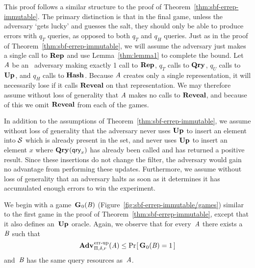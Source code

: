 This proof follows a similar structure to the proof of
Theorem~\ref{thm:sbf-errep-immutable}.
%
The primary distinction is that in the final game, unless the adversary `gets
lucky' and guesses the salt, they should only be able to produce errors with
$q_T$ queries, as opposed to both $q_T$ and $q_H$ queries.
%
Just as in the proof of Theorem~\ref{thm:sbf-errep-immutable}, we will assume
the adversary just makes a single call to $\textup{\textbf{Rep}}\hspace{0.5pt}$ and use Lemma~\ref{thm:lemma1}
to complete the bound. Let $\mathit{A}$ be an \erreps\ adversary making exactly 1
call to $\textup{\textbf{Rep}}\hspace{0.5pt}$, $q_T$ calls to $\textup{\textbf{Qry}}\hspace{0.5pt}$, $q_U$ calls to $\textup{\textbf{Up}}\hspace{0.5pt}$, and $q_H$ calls
to $\textup{\textbf{Hash}}\hspace{0.5pt}$. Because $\mathit{A}$ creates only a single representation, it will
necessarily lose if it calls $\mathbf{Reveal}$ on that representation. We may therefore
assume without loss of generality that $\mathit{A}$ makes no calls to $\mathbf{Reveal}$, and
because of this we omit $\mathbf{Reveal}$ from each of the games.
%

In addition to the assumptions of Theorem~\ref{thm:sbf-errep-immutable}, we
assume without loss of generality that the adversary never uses $\textup{\textbf{Up}}\hspace{0.5pt}$ to insert
an element into $\mathcal{S}$ which is already present in the set, and never uses
$\textup{\textbf{Up}}\hspace{0.5pt}$ to insert an element $x$ where $\textup{\textbf{Qry}}\hspace{0.5pt}(\mathsf{qry}_x)$ has already been called
and has returned a positive result. Since these insertions do not change the
filter, the adversary would gain no advantage from performing these updates.
Furthermore, we assume without loss of generality that an adversary halts as
soon as it determines it has accumulated enough errors to win the experiment.

We begin with a game~$\textup{\textbf{G}}\hspace{0.5pt}_0(\mathit{B})$
(Figure~\ref{fig:sbf-errep-immutable/games}) similar to the first game in the
proof of Theorem~\ref{thm:sbf-errep-immutable}, except that it also defines
an~$\textup{\textbf{Up}}\hspace{0.5pt}$ oracle. Again, we observe that for every~$\mathit{A}$ there exists
a~$\mathit{B}$ such that
\begin{equation}
  \Adv{\errep}_{\Pi,\delta,r}(\advA) \leq \Prob{\game_0(\advB) = 1}
\end{equation}
and~$\mathit{B}$ has the same query resources as~$\mathit{A}$.

